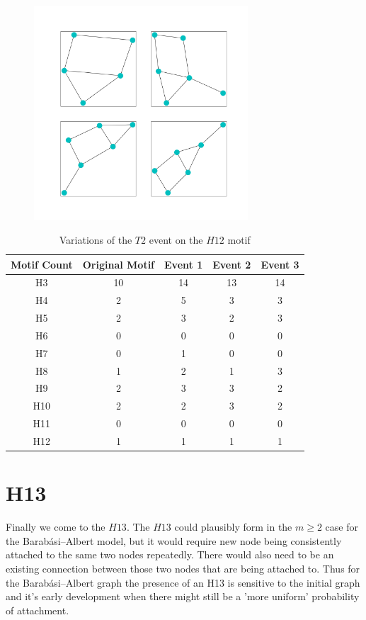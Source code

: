 \begin{figure}[!ht]
    \includegraphics[width=8cm]{Images/H12_evolution.png}
    \centering
\end{figure}

\begin{table}
    \centering
    \begin{tabular}{||c c c c c||} 
    \hline
    Motif Count & Original Motif & Event 1 & Event 2 & Event 3 \\ [0.5ex] 
    \hline\hline
    H3 & 10 & 14 & 13 & 14\\ 
    \hline
    H4 & 2 & 5 & 3 & 3 \\
    \hline
    H5 & 2 & 3 & 2 & 3 \\
    \hline
    H6 & 0 & 0 & 0 & 0 \\
    \hline
    H7 & 0 & 1 & 0 & 0 \\
    \hline
    H8 & 1 & 2 & 1 & 3\\
    \hline
    H9 & 2 & 3 & 3 & 2 \\
    \hline
    H10 & 2 & 2 & 3 & 2 \\
    \hline
    H11 & 0 & 0 & 0 & 0 \\
    \hline
    H12 & 1 & 1 & 1 & 1\\
    \hline
   \end{tabular}
   \caption{Variations of the $T2$ event on the $H12$ motif}
   \label{table:10}
\end{table}


\FloatBarrier

\section{H13}
Finally we come to the $H13$. The $H13$ could plausibly form in the $m \geq 2$ case for the 
Barabási–Albert model, but it would require new node being consistently attached to the 
same two nodes repeatedly. There would also need to be an existing connection between those two nodes
that are being attached to. Thus for the Barabási–Albert graph the presence of an H13 is sensitive
to the initial graph and it's early development when there might still be a 'more uniform' probability
of attachment.

